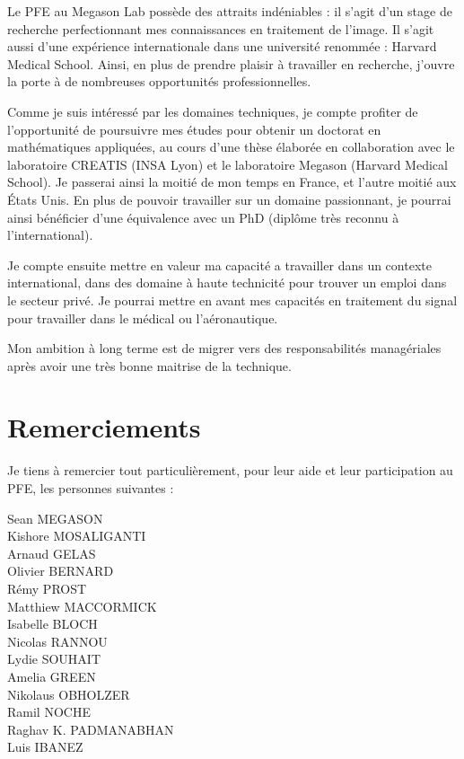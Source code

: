 Le PFE au Megason Lab possède des attraits indéniables :
il s'agit d'un stage de recherche perfectionnant mes connaissances en traitement de l'image.
Il s'agit aussi d'une expérience internationale dans une université renommée : Harvard Medical School.
Ainsi, en plus de prendre plaisir à travailler en recherche, j'ouvre la porte à de nombreuses opportunités professionnelles.

Comme je suis intéressé par les domaines techniques,
je compte profiter de l'opportunité de poursuivre mes études pour obtenir un doctorat en mathématiques appliquées,
au cours d'une thèse élaborée en collaboration avec le laboratoire CREATIS (INSA Lyon)
et le laboratoire Megason (Harvard Medical School).
Je passerai ainsi la moitié de mon temps en France, et l'autre moitié aux États Unis.
En plus de pouvoir travailler sur un domaine passionnant,
je pourrai ainsi bénéficier d'une équivalence avec un PhD (diplôme très reconnu à l'international). 

Je compte ensuite mettre en valeur ma capacité a travailler dans un contexte international,
dans des domaine à haute technicité pour trouver un emploi  dans le secteur privé.
Je pourrai mettre en avant mes capacités en traitement du signal pour travailler dans le médical ou l'aéronautique.

Mon ambition à long terme est de migrer vers des responsabilités managériales après avoir une très bonne maitrise de la technique.

\chapter*{Remerciements}
{}

Je tiens à remercier tout particulièrement, pour leur aide et leur participation au PFE, les personnes suivantes :

\begin{center}
Sean MEGASON\\
Kishore MOSALIGANTI\\
Arnaud GELAS\\
Olivier BERNARD\\
Rémy PROST\\
Matthiew MACCORMICK\\
Isabelle BLOCH\\
Nicolas RANNOU\\
Lydie SOUHAIT\\
Amelia GREEN\\
Nikolaus OBHOLZER\\
Ramil NOCHE\\
Raghav K. PADMANABHAN\\
Luis IBANEZ\\
\end{center}


\appendix







